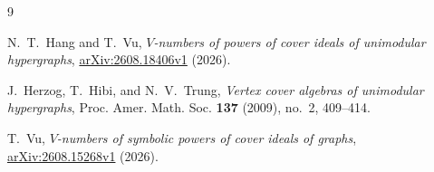 \documentclass[11pt]{amsart}
\begin{document}
\begin{thebibliography}{9}

N.~T.~Hang and T.~Vu,
\emph{$V$-numbers of powers of cover ideals of unimodular hypergraphs},
\href{https://arxiv.org/abs/2608.18406}{arXiv:2608.18406v1} (2026).

J.~Herzog, T.~Hibi, and N.~V.~Trung,
\emph{Vertex cover algebras of unimodular hypergraphs},
Proc. Amer. Math. Soc. \textbf{137} (2009), no.~2, 409--414.

T.~Vu,
\emph{$V$-numbers of symbolic powers of cover ideals of graphs},
\href{https://arxiv.org/abs/2608.15268}{arXiv:2608.15268v1} (2026).

\end{thebibliography}
\end{document}
